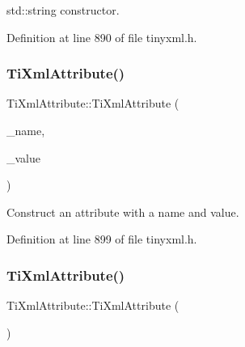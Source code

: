 std\+::string constructor. 



Definition at line 890 of file tinyxml.\+h.

\hypertarget{class_ti_xml_attribute_a759d0b76fb8fcf765ecab243bc14f05e}{}\label{class_ti_xml_attribute_a759d0b76fb8fcf765ecab243bc14f05e} 
\subsubsection{\texorpdfstring{Ti\+Xml\+Attribute()}{TiXmlAttribute()}\hspace{0.1cm}{\footnotesize\ttfamily [3/4]}}
{\footnotesize\ttfamily Ti\+Xml\+Attribute\+::\+Ti\+Xml\+Attribute (\begin{DoxyParamCaption}\item[{const char $\ast$}]{\+\_\+name,  }\item[{const char $\ast$}]{\+\_\+value }\end{DoxyParamCaption})\hspace{0.3cm}{\ttfamily [inline]}}



Construct an attribute with a name and value. 



Definition at line 899 of file tinyxml.\+h.

\hypertarget{class_ti_xml_attribute_aee53e434ace7271afc5ce51aeea0b400}{}\label{class_ti_xml_attribute_aee53e434ace7271afc5ce51aeea0b400} 
\subsubsection{\texorpdfstring{Ti\+Xml\+Attribute()}{TiXmlAttribute()}\hspace{0.1cm}{\footnotesize\ttfamily [4/4]}}
{\footnotesize\ttfamily Ti\+Xml\+Attribute\+::\+Ti\+Xml\+Attribute (\begin{DoxyParamCaption}\item[{const \hyperlink{class_ti_xml_attribute}{Ti\+Xml\+Attribute} \&}]{ }\end{DoxyParamCaption})\hspace{0.3cm}{\ttfamily [private]}}



